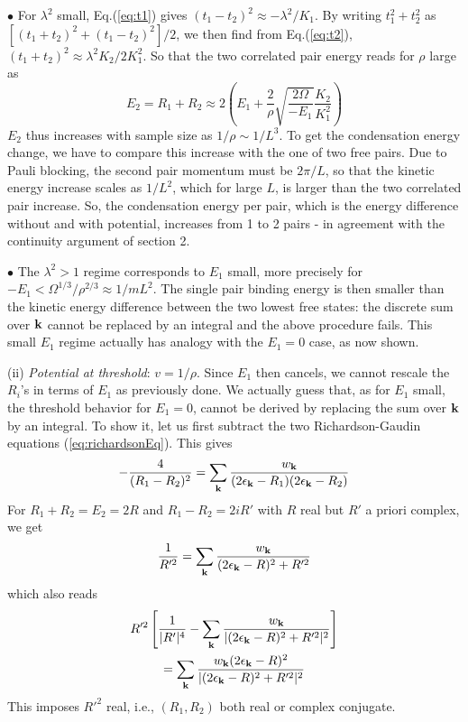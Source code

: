 \documentclass[5p,twocolumn]{elsarticle}
\begin{document}
$\bullet$ For $\lambda^{2}$ small, Eq.(\ref{eq:t1}) gives $(t_{1}-t_{2})^{2}\approx-\lambda^{2}/K_{1}$. By writing $t_{1}^{2}+t_{2}^{2}$ as $\left[(t_{1}+t_{2})^{2}+(t_{1}-t_{2})^{2}\right]/2$, we then find from Eq.(\ref{eq:t2}), $(t_{1}+t_{2})^{2}\approx\lambda^{2}K_{2}/2K_{1}^{2}$.  So that the two correlated pair energy  reads for $\rho$ large as 
\begin{equation}
E_{2}=R_{1}+R_{2}\approx2\left(E_{1}+\frac{2}{\rho}\sqrt{\frac{2\Omega}{-E_{1}}}\frac{K_{2}}{K_{1}^{2}}\right)
\end{equation}
$E_{2}$ thus increases with sample size as $1/\rho\sim1/L^{3}$.
To get the condensation energy change, we have to compare this increase with the one of two free pairs.  Due to Pauli blocking, the second pair momentum must be $2\pi/L$, so that the kinetic energy increase scales as $1/L^{2}$, which for large $L$, is larger than the two correlated pair increase. 
So, the condensation energy per pair, which is the energy difference without and with potential, increases from 1 to 2 pairs - in agreement with the continuity argument of section 2. 

 $\bullet$ The $\lambda^{2}>1$ regime corresponds to $E_{1}$ small, more precisely for $-E_{1}<\Omega^{1/3}/\rho^{2/3}\approx1/mL^{2}$.  The single pair binding energy is then smaller than the kinetic energy difference between the two lowest free states: the discrete sum over $\mathbf{k}$ cannot be replaced by an integral and the above procedure fails.  This small $E_1$ regime  actually has analogy with the $E_1=0$ case, as now shown. 


(ii) {\it Potential at threshold}: $v=1/\rho$. Since $E_1$ then cancels, we cannot rescale the $R_i$'s in terms of $E_1$ as previously done. We actually guess that, as for $E_1$ small, the threshold behavior for $E_1=0$, cannot be derived by replacing the sum over $\mathbf{k}$ by an integral.
To show it, let us first subtract the two Richardson-Gaudin equations (\ref{eq:richardsonEq}). This gives
\begin{equation}
-\frac{4}{(R_1-R_2)^2}=\sum_{\mathbf{k}}\frac{w_{\mathbf{k}}}{(2\epsilon_{\mathbf{k}}-R_1)(2\epsilon_{\mathbf{k}}-R_2)}\label{eq:2PairMinus}
\end{equation}
For $R_1+R_2=E_2=2R$ and $R_1-R_2=2iR'$ with $R$ real but $R'$ a priori complex, we get
\begin{equation}
\frac{1}{R'^2}=\sum_{\mathbf{k}}\frac{w_{\mathbf{k}}}{(2\epsilon_{\mathbf{k}}-R)^2+R'^2}
\end{equation}
which also reads 
\begin{multline}
R'^{2}\left[\frac{1}{|R'|^{4}}-\sum_{\mathbf{k}}\frac{w_{\mathbf{k}}}{|(2\epsilon_{\mathbf{k}}-R)^{2}+R'^{2}|^{2}}\right]\\
=\sum_{\mathbf{k}}\frac{w_{\mathbf{k}}(2\epsilon_{\mathbf{k}}-R)^{2}}{|(2\epsilon_{\mathbf{k}}-R)^{2}+R'^{2}|^{2}}
\end{multline}
This imposes $R'^2$ real, i.e., $(R_1,R_2)$ both real or complex conjugate.
\end{document}
